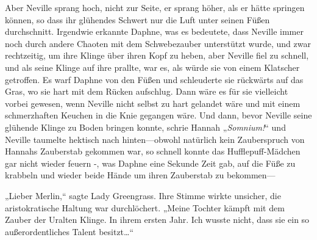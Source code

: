 Aber Neville sprang hoch, nicht zur Seite, er sprang höher, als er hätte springen können, so dass ihr glühendes Schwert nur die Luft unter seinen Füßen durchschnitt. Irgendwie erkannte Daphne, was es bedeutete, dass Neville immer noch durch andere Chaoten mit dem Schwebezauber unterstützt wurde, und zwar rechtzeitig, um ihre Klinge über ihren Kopf zu heben, aber Neville fiel zu schnell, und als seine Klinge auf ihre prallte, war es, als würde sie von einem Klatscher getroffen. Es warf Daphne von den Füßen und schleuderte sie rückwärts auf das Gras, wo sie hart mit dem Rücken aufschlug. Dann wäre es für sie vielleicht vorbei gewesen, wenn Neville nicht selbst zu hart gelandet wäre und mit einem schmerzhaften Keuchen in die Knie gegangen wäre. Und dann, bevor Neville seine glühende Klinge zu Boden bringen konnte, schrie Hannah „\emph{Somnium!}“ und Neville taumelte hektisch nach hinten—obwohl natürlich kein Zauberspruch von Hannahs Zauberstab gekommen war, so schnell konnte das Hufflepuff-Mädchen gar nicht wieder feuern -, was Daphne eine Sekunde Zeit gab, auf die Füße zu krabbeln und wieder beide Hände um ihren Zauberstab zu bekommen—

\later

„Lieber Merlin,“ sagte Lady Greengrass. Ihre Stimme wirkte unsicher, die aristokratische Haltung war durchlöchert. „Meine Tochter kämpft mit dem Zauber der Uralten Klinge. In ihrem ersten Jahr. Ich wusste nicht, dass sie ein so außerordentliches Talent besitzt…“

